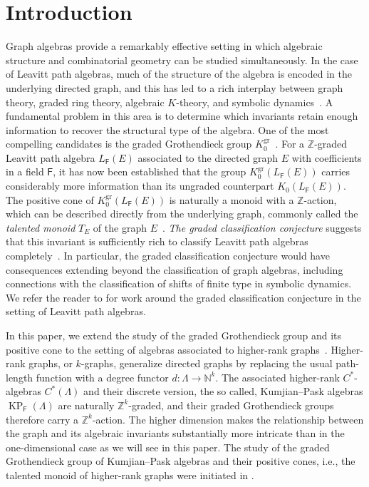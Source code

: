 \documentclass[a4paper,reqno,12pt]{amsart}
\numberwithin{equation}{section}
\theoremstyle{definition}
\theoremstyle{remark}
\def\FF{\mathsf{F}}
\newcommand{\KP}{\operatorname{KP}}
\begin{document}
\section{Introduction}\label{sec intro}
Graph algebras provide a remarkably effective setting in which algebraic structure and combinatorial geometry can be studied simultaneously. In the case of Leavitt path algebras, much of the structure of the algebra is encoded in the underlying directed graph, and this has led to a rich interplay between graph theory, graded ring theory, algebraic $K$-theory, and symbolic dynamics~\cite{lpabook,AbramsHazrat}. A fundamental problem in this area is to determine which invariants retain enough information to recover the structural type of the algebra. One of the most compelling candidates is the graded Grothendieck group $K_0^{\mathrm{gr}}$~\cite{haz2013}. For a $\mathbb Z$-graded Leavitt path algebra $L_\FF(E)$ associated to the directed graph $E$ with coefficients in a field $\FF$, it has now been established that the group
$K_0^{\mathrm{gr}}(L_\FF(E))$ carries considerably more information than its ungraded counterpart $K_0(L_\FF(E))$. The positive cone of $K_0^{\mathrm{gr}}(L_\FF(E))$ is naturally a monoid with a $\mathbb Z$-action, which can be described directly from the underlying graph, commonly called the \emph{talented monoid} $T_E$ of the graph $E$~\cite{hazli,Luiz}. \emph{The graded classification conjecture} suggests that this invariant is  sufficiently rich to classify Leavitt path algebras completely~\cite{haz2013}. In particular, the graded classification conjecture would have consequences extending beyond the classification of graph algebras, including connections with the classification of shifts of finite type in symbolic dynamics. We refer the reader to \cite{AbramsRuizTomforde,AraPardo,AraDoNam,ArnoneLifting,arnonecor, ArnoneCortinasNonexistence,BockHazratSebandal,willie,DoHazratNam,EilersRuizSims,VasFull,VasGradedClassification} for work around the graded classification conjecture in the setting of Leavitt path algebras. 

In this paper, we extend the study of the graded Grothendieck group and its positive cone to the setting of algebras associated to higher-rank graphs~\cite{KumjianPask,Pino}. Higher-rank graphs, or $k$-graphs, generalize directed graphs by replacing the usual path-length function with a degree functor $d:\Lambda\longrightarrow \mathbb N^k$. The associated higher-rank $C^*$-algebras $C^*(\Lambda)$ and their discrete version, the so called, Kumjian--Pask algebras $\KP_\FF(\Lambda)$ are naturally $\mathbb Z^k$-graded, and their graded Grothendieck groups therefore carry a $\mathbb Z^k$-action. The higher dimension makes the relationship between the graph and its algebraic invariants substantially more intricate than in the one-dimensional case as we will see in this paper. The study of the graded Grothendieck group of Kumjian--Pask algebras and their positive cones, i.e., the talented monoid of higher-rank graphs were initiated in \cite{HMPS1,HMPS2}. 
\end{document}
